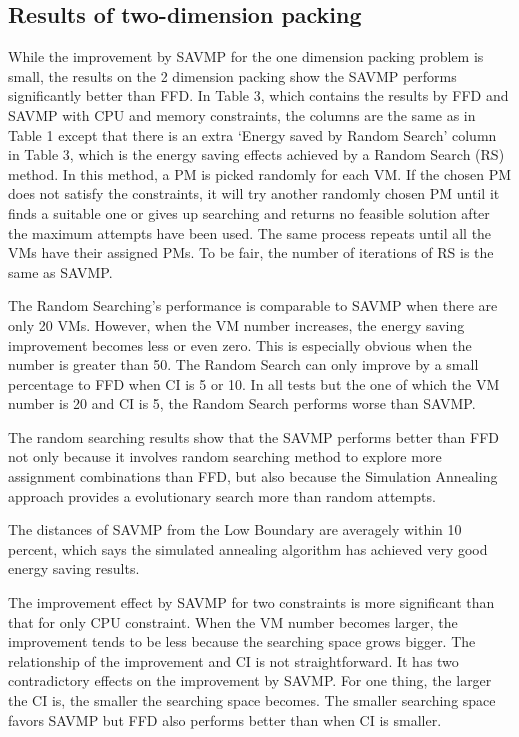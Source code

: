 \documentclass[10pt, conference, compsocconf]{IEEEtran}
\begin{document}
\subsection{Results of two-dimension packing}
While the improvement by SAVMP for the one dimension packing problem is small,
the results on the 2 dimension packing show the SAVMP performs significantly
better than FFD. In Table 3, which contains the results by FFD and SAVMP with
CPU and memory constraints, the columns are the same as in Table 1 except that
there is an extra `Energy saved by Random Search' column in Table 3, which
is the energy saving effects achieved by a Random Search (RS) method. In this
method, a PM is picked randomly for each VM. If the chosen PM does not satisfy the
constraints, it will try another randomly chosen PM until it finds a suitable
one or gives up searching and returns no feasible solution after the maximum
attempts have been used. The same process repeats until all the VMs have their
assigned PMs. To be fair, the number of iterations of RS is the same as SAVMP. 

The Random Searching's performance is comparable to SAVMP when there are only 20
VMs. However, when the VM number increases, the energy saving improvement
becomes less or even zero. This is especially obvious when the number is greater
than 50.
The Random Search can only improve by a small percentage to FFD when CI is 5 or 10. In all
tests but the one of which the VM number is 20 and CI is 5, the Random Search
performs worse than SAVMP.

The random searching results show that the SAVMP performs better than FFD
not only because it involves random searching method to explore more assignment
combinations than FFD, but also because the Simulation Annealing approach
provides a evolutionary search more than random attempts.

The distances of SAVMP from the Low Boundary are averagely within 10 percent,
which says the simulated annealing algorithm has achieved very good energy
saving results.

The improvement effect by SAVMP for two constraints is more significant than
that for only CPU constraint. When the VM number becomes larger, the improvement
tends to be less because the searching space grows bigger. The relationship of
the improvement and CI is not straightforward. It has two contradictory effects
on the improvement by SAVMP. For one thing, the larger the CI is, the smaller
the searching space becomes. The smaller searching space favors SAVMP but FFD
also performs better than when CI is smaller.
\end{document}
